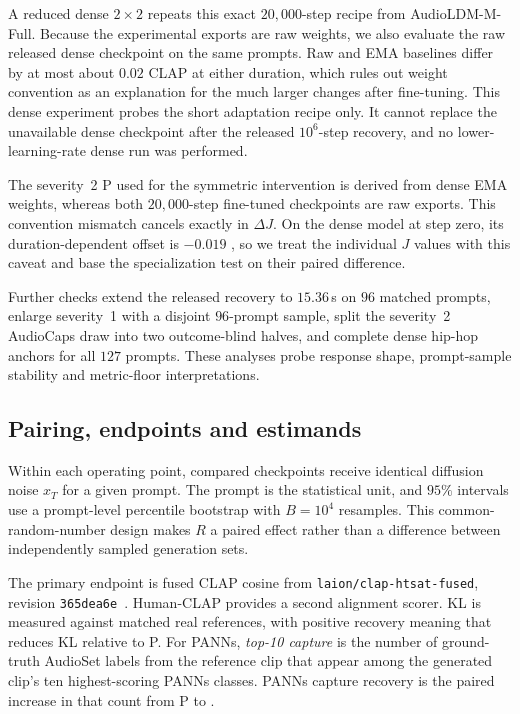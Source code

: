 A reduced dense $2\times2$ repeats this exact $20{,}000$-step recipe from AudioLDM-M-Full. Because the experimental exports are raw weights, we also evaluate the raw released dense checkpoint on the same prompts. Raw and EMA baselines differ by at most about $0.02$ CLAP at either duration, which rules out weight convention as an explanation for the much larger changes after fine-tuning. This dense experiment probes the short adaptation recipe only. It cannot replace the unavailable dense checkpoint after the released $10^{6}$-step recovery, and no lower-learning-rate dense run was performed.

The severity~2 P used for the symmetric intervention is derived from dense EMA weights, whereas both $20{,}000$-step fine-tuned checkpoints are raw exports. This convention mismatch cancels exactly in $\Delta J$. On the dense model at step zero, its duration-dependent offset is $-0.019$ , so we treat the individual $J$ values with this caveat and base the specialization test on their paired difference.

Further checks extend the released recovery to $15.36$\,s on $96$ matched prompts, enlarge severity~1 with a disjoint $96$-prompt sample, split the severity~2 AudioCaps draw into two outcome-blind halves, and complete dense hip-hop anchors for all $127$ prompts. These analyses probe response shape, prompt-sample stability and metric-floor interpretations.

\subsection{Pairing, endpoints and estimands}
Within each operating point, compared checkpoints receive identical diffusion noise $x_T$ for a given prompt. The prompt is the statistical unit, and $95\%$ intervals use a prompt-level percentile bootstrap with $B=10^{4}$ resamples. This common-random-number design makes $R$ a paired effect rather than a difference between independently sampled generation sets.

The primary endpoint is fused CLAP cosine from \texttt{laion/\allowbreak clap-htsat-fused}, revision \texttt{365dea6e}~\cite{wu2023clap}. Human-CLAP provides a second alignment scorer. KL is measured against matched real references, with positive recovery meaning that \PFT{} reduces KL relative to P. For PANNs, \emph{top-10 capture} is the number of ground-truth AudioSet labels from the reference clip that appear among the generated clip's ten highest-scoring PANNs classes. PANNs capture recovery is the paired increase in that count from P to \PFT{}.

